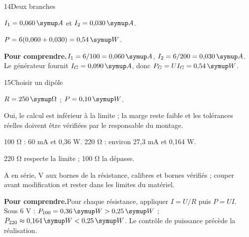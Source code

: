 \par\noindent\begin{minipage}{\linewidth}
\begin{corrige}{14}{Deux branches}
\begin{questions}
\item $I_1=0{,}060\unite A$ et $I_2=0{,}030\unite A$.
\item $P=6(0{,}060+0{,}030)=0{,}54\unite W$.
\end{questions}
\par\smallskip\noindent\textbf{Pour comprendre.}\enspace $I_1=6/100=0{,}060\unite A$, $I_2=6/200=0{,}030\unite A$. Le générateur fournit $I_G=0{,}090\unite A$, donc $P_G=UI_G=0{,}54\unite W$.\par
{}
\end{corrige}
\end{minipage}
\par\noindent\begin{minipage}{\linewidth}
\begin{corrige}{15}{Choisir un dipôle}
\begin{questions}
\item $R=250\unite\Omega$ ; $P=0{,}10\unite W$.
\item Oui, le calcul est inférieur à la limite ; la marge reste faible et les tolérances réelles doivent être vérifiées par le responsable du montage.
\end{questions}
\end{corrige}
\end{minipage}
\par\noindent\begin{minipage}{\linewidth}
\label{cor-defi-14}\begin{questions}
\item 100 Ω : 60 mA et 0,36 W. 220 Ω : environ 27,3 mA et 0,164 W.
\item 220 Ω respecte la limite ; 100 Ω la dépasse.
\item A en série, V aux bornes de la résistance, calibres et bornes vérifiés ; couper avant modification et rester dans les limites du matériel.
\end{questions}
\par\smallskip\noindent\textbf{Pour comprendre.}\enspace Pour chaque résistance, appliquer $I=U/R$ puis $P=UI$. Sous 6 V : $P_{100}=0{,}36\unite W>0{,}25\unite W$ ; $P_{220}\approx0{,}164\unite W<0{,}25\unite W$. Le contrôle de puissance précède la réalisation.\par
{}
\end{minipage}
